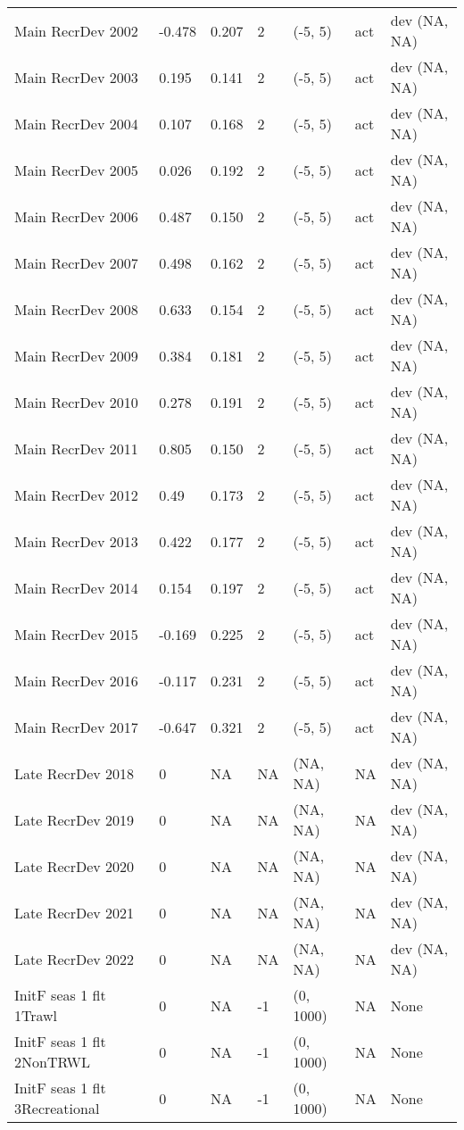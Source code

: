 \documentclass[11pt,
  letterpaper,
]{article}
\begin{document}
\begin{landscape}
\begin{longtable}[t]{>{\raggedright\arraybackslash}p{7.5cm}lllll>{\raggedright\arraybackslash}p{3.5cm}}
Main RecrDev 2002 & -0.478 & 0.207 & 2 & (-5, 5) & act & dev (NA, NA)\\
Main RecrDev 2003 & 0.195 & 0.141 & 2 & (-5, 5) & act & dev (NA, NA)\\
Main RecrDev 2004 & 0.107 & 0.168 & 2 & (-5, 5) & act & dev (NA, NA)\\
Main RecrDev 2005 & 0.026 & 0.192 & 2 & (-5, 5) & act & dev (NA, NA)\\
Main RecrDev 2006 & 0.487 & 0.150 & 2 & (-5, 5) & act & dev (NA, NA)\\
Main RecrDev 2007 & 0.498 & 0.162 & 2 & (-5, 5) & act & dev (NA, NA)\\
Main RecrDev 2008 & 0.633 & 0.154 & 2 & (-5, 5) & act & dev (NA, NA)\\
Main RecrDev 2009 & 0.384 & 0.181 & 2 & (-5, 5) & act & dev (NA, NA)\\
Main RecrDev 2010 & 0.278 & 0.191 & 2 & (-5, 5) & act & dev (NA, NA)\\
Main RecrDev 2011 & 0.805 & 0.150 & 2 & (-5, 5) & act & dev (NA, NA)\\
Main RecrDev 2012 & 0.49 & 0.173 & 2 & (-5, 5) & act & dev (NA, NA)\\
Main RecrDev 2013 & 0.422 & 0.177 & 2 & (-5, 5) & act & dev (NA, NA)\\
Main RecrDev 2014 & 0.154 & 0.197 & 2 & (-5, 5) & act & dev (NA, NA)\\
Main RecrDev 2015 & -0.169 & 0.225 & 2 & (-5, 5) & act & dev (NA, NA)\\
Main RecrDev 2016 & -0.117 & 0.231 & 2 & (-5, 5) & act & dev (NA, NA)\\
Main RecrDev 2017 & -0.647 & 0.321 & 2 & (-5, 5) & act & dev (NA, NA)\\
Late RecrDev 2018 & 0 & NA & NA & (NA, NA) & NA & dev (NA, NA)\\
Late RecrDev 2019 & 0 & NA & NA & (NA, NA) & NA & dev (NA, NA)\\
Late RecrDev 2020 & 0 & NA & NA & (NA, NA) & NA & dev (NA, NA)\\
Late RecrDev 2021 & 0 & NA & NA & (NA, NA) & NA & dev (NA, NA)\\
Late RecrDev 2022 & 0 & NA & NA & (NA, NA) & NA & dev (NA, NA)\\
InitF seas 1 flt 1Trawl & 0 & NA & -1 & (0, 1000) & NA & None\\
InitF seas 1 flt 2NonTRWL & 0 & NA & -1 & (0, 1000) & NA & None\\
InitF seas 1 flt 3Recreational & 0 & NA & -1 & (0, 1000) & NA & None\\

\end{longtable}
\end{landscape}
\end{document}
